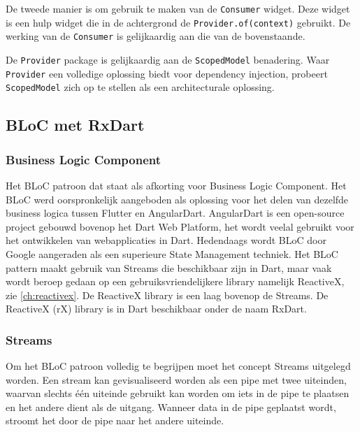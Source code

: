 De tweede manier is om gebruik te maken van de \verb|Consumer| widget. Deze widget is een hulp widget die in de achtergrond de \verb|Provider.of(context)| gebruikt. De werking van de \verb|Consumer| is gelijkaardig aan die van de bovenstaande. 

De \verb|Provider| package is gelijkaardig aan de \verb|ScopedModel| benadering. Waar \verb|Provider| een volledige oplossing biedt voor dependency injection, probeert \verb|ScopedModel| zich op te stellen als een architecturale oplossing.

\subsection{BLoC met RxDart}
\subsubsection{Business Logic Component}
Het BLoC patroon dat staat als afkorting voor Business Logic Component. Het BLoC werd oorspronkelijk aangeboden als oplossing voor het delen van dezelfde business logica tussen Flutter en AngularDart. AngularDart is een open-source project gebouwd bovenop het Dart Web Platform, het wordt veelal gebruikt voor het ontwikkelen van webapplicaties in Dart. Hedendaags wordt BLoC door Google aangeraden als een superieure State Management techniek. Het BLoC pattern maakt gebruik van Streams die beschikbaar zijn in Dart, maar vaak wordt beroep gedaan op een gebruiksvriendelijkere library namelijk ReactiveX, zie \ref{ch:reactivex}. De ReactiveX library is een laag bovenop de Streams.
\newline \newline
De ReactiveX (rX) library is in Dart beschikbaar onder de naam RxDart.

\subsubsection{Streams}
Om het BLoC patroon volledig te begrijpen moet het concept Streams uitgelegd worden.
Een stream kan gevisualiseerd worden als een pipe met twee uiteinden, waarvan slechts
één uiteinde gebruikt kan worden om iets in de pipe te plaatsen en het andere dient als de uitgang. Wanneer data in de pipe
geplaatst wordt, stroomt het door de pipe naar het andere uiteinde. \autocite{Boelens2018}

